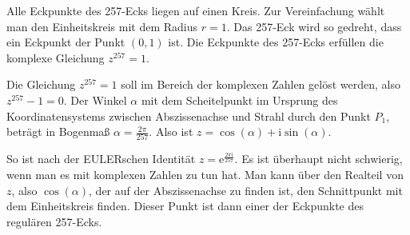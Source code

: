 \documentclass[11pt]{article}
\newcommand{\ii}{\mathrm{i}}
\begin{document}
Alle Eckpunkte des 257-Ecks liegen auf einen Kreis. Zur Vereinfachung wählt
man den Einheitskreis mit dem Radius $r = 1$. Das 257-Eck wird so gedreht,
dass ein Eckpunkt der Punkt $(0,1)$ ist. Die Eckpunkte des 257-Ecks erfüllen
die komplexe Gleichung $z^{257} = 1$.

Die Gleichung $z^{257} =1$ soll im Bereich der komplexen Zahlen gelöst werden,
also $z^{257} - 1 = 0$. Der Winkel $\alpha$ mit dem Scheitelpunkt im Ursprung
des Koordinatensystems zwischen Abszissenachse und Strahl durch den Punkt
$P_1$, beträgt in Bogenmaß $\alpha= \frac{2\pi}{257}$. Also ist $z =
\cos(\alpha) + \ii\sin(\alpha)$.

So ist nach der EULERschen Identität $z =
\mathrm{e}^{\frac{2\pi\ii}{257}}$.  Es ist überhaupt nicht schwierig,
wenn man es mit komplexen Zahlen zu tun hat. Man kann über den Realteil von
$z$, also $\cos(\alpha)$, der auf der Abszissenachse zu finden ist, den
Schnittpunkt mit dem Einheitskreis finden. Dieser Punkt ist dann einer der
Eckpunkte des regulären 257-Ecks.
\end{document}
